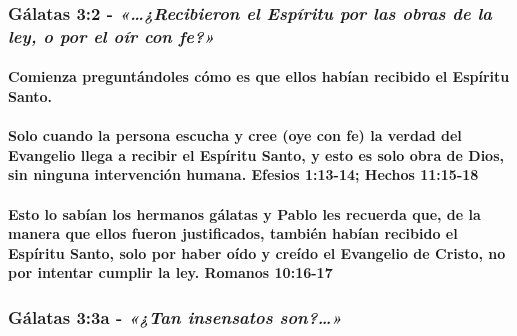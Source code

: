 \documentclass[11a pt,twoside]{article}
\newcommand{\scripture}[1]{%
  {\fontsize{12pt}{16pt}\selectfont\ScriptureFont\itshape #1}%
}
\def\textbf#1{#1}%
\let\oldsubsubsection\subsubsection
\renewcommand{\subsubsection}{\needspace{4\baselineskip}\oldsubsubsection}
\let\oldparagraph\paragraph
\renewcommand{\paragraph}{\needspace{3\baselineskip}\oldparagraph}
\begin{document}
\subsubsection{\texorpdfstring{Gálatas 3:2 -
\scripture{«…¿Recibieron el Espíritu por las obras de la ley, o por el oír con fe?»}}{Gálatas 3:2 - }}\label{guxe1latas-32---recibieron-el-espuxedritu-por-las-obras-de-la-ley-o-por-el-ouxedr-con-fe}

\paragraph{Comienza preguntándoles cómo es que ellos habían recibido el
Espíritu
Santo.}\label{comienza-preguntuxe1ndoles-cuxf3mo-es-que-ellos-habuxedan-recibido-el-espuxedritu-santo.}

\paragraph{Solo cuando la persona escucha y cree (oye con fe) la verdad
del Evangelio llega a recibir el Espíritu Santo, y esto es solo obra de
Dios, sin ninguna intervención humana. Efesios 1:13-14; Hechos
11:15-18}\label{solo-cuando-la-persona-escucha-y-cree-oye-con-fe-la-verdad-del-evangelio-llega-a-recibir-el-espuxedritu-santo-y-esto-es-solo-obra-de-dios-sin-ninguna-intervenciuxf3n-humana.-efesios-113-14-hechos-1115-18}

\paragraph{\texorpdfstring{Esto lo sabían los hermanos gálatas y Pablo
les recuerda que, de la manera que ellos fueron justificados, también
habían recibido el Espíritu Santo, solo por haber \textbf{oído y creído}
el Evangelio de Cristo, no por intentar cumplir la ley. Romanos
10:16-17}{Esto lo sabían los hermanos gálatas y Pablo les recuerda que, de la manera que ellos fueron justificados, también habían recibido el Espíritu Santo, solo por haber oído y creído el Evangelio de Cristo, no por intentar cumplir la ley. Romanos 10:16-17}}\label{esto-lo-sabuxedan-los-hermanos-guxe1latas-y-pablo-les-recuerda-que-de-la-manera-que-ellos-fueron-justificados-tambiuxe9n-habuxedan-recibido-el-espuxedritu-santo-solo-por-haber-ouxeddo-y-creuxeddo-el-evangelio-de-cristo-no-por-intentar-cumplir-la-ley.-romanos-1016-17}

\subsubsection{\texorpdfstring{Gálatas 3:3a -
\scripture{«¿Tan insensatos son?…»}}{Gálatas 3:3a - }}\label{guxe1latas-33a---tan-insensatos-son}
\end{document}
